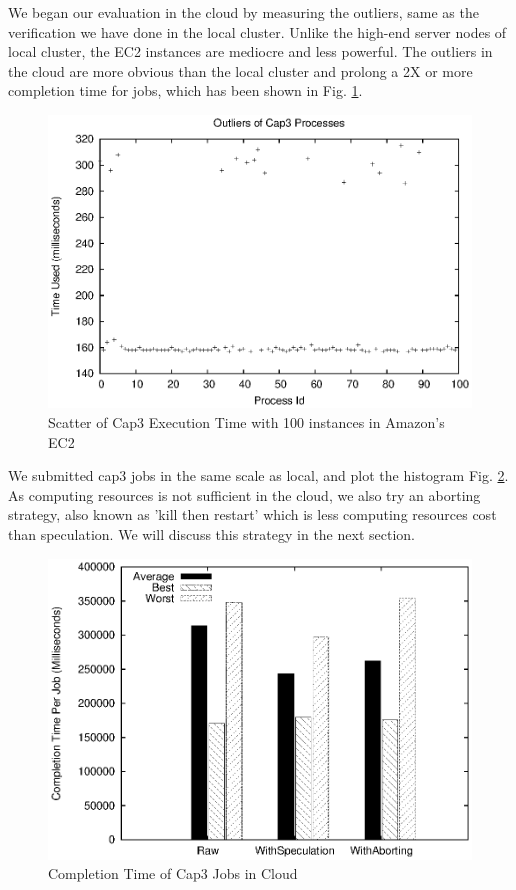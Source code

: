 We began our evaluation in the cloud by measuring the outliers, same as the verification we have done in the local cluster. Unlike the high-end server nodes of local cluster, the EC2 instances are mediocre and less powerful. The outliers in the cloud are more obvious than the local cluster and prolong a 2X or more completion time for jobs, which has been shown in Fig. \ref{figure:outlier_cloud}.

\begin{figure}
\centering
\includegraphics[width=0.9\columnwidth]{figures/cloud_outliers.eps}
\caption{Scatter of Cap3 Execution Time with 100 instances in Amazon's EC2}
\label{figure:outlier_cloud}
\end{figure}

We submitted cap3 jobs in the same scale as local, and plot the histogram Fig. \ref{figure:completiontime_cap3_cloud}. As computing resources is not sufficient in the cloud, we also try an aborting strategy, also known as 'kill then restart' which is less computing resources cost than speculation. We will discuss this strategy in the next section.

\begin{figure}
\centering
\includegraphics[width=0.9\columnwidth]{figures/cloud_completiontime_cap3.eps}
\caption{Completion Time of Cap3 Jobs in Cloud}
\label{figure:completiontime_cap3_cloud}
\end{figure}

